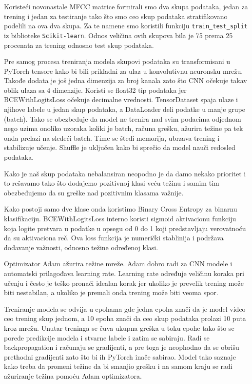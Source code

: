 \documentclass[a4paper,12pt]{article}
\begin{document}
Koristeći novonastale MFCC matrice formirali smo dva skupa podataka, jedan za trening i jedan za testiranje tako što smo ceo skup podataka stratifikovano podelili na ova dva skupa. Za te namene smo koristili funkciju \texttt{train\_test\_split} iz biblioteke \texttt{Scikit-learn}. Odnos veličina ovih skupova bila je 75 prema 25 procenata za trening odnosno test skup podataka. 

Pre samog procesa treniranja modela skupovi podataka su transformisani u PyTorch tensore kako bi bili prikladni za ulaz u konvolutivnu neuronsku mrežu. Takođe dodata je još jedna dimenzija za broj kanala zato što CNN očekuje takav oblik ulaza sa 4 dimenzije. Koristi se float32 tip podataka jer BCEWithLogitsLoss očekuje decimalne vrednosti. TensorDataset spaja ulaze i njihove labele u jedan skup podataka, a DataLoader deli podatke u manje grupe (batch). Tako se obezbeđuje da model ne trenira nad svim podacima odjednom nego uzima onoliko uzoraka koliki je batch, računa grešku, ažurira težine pa tek onda prelazi na sledeći batch. Time se štedi memorija, ubrzava trening i stabilizuje učenje. Shuffle je uključen kako bi sprečio da model nauči redosled podataka.

Kako je naš skup podataka nebalansiran neopodno je da damo nekako prioritet i to rešavamo tako što dodajemo pozitivnoj klasi veću težinu i samim tim obezbeđujemo da su greške nad pozitivnim klasama važnije.

Kako postoji samo dve klase onda koristimo Binary Cross Entropy za binarnu klasifikaciju. BCEWithLogitsLoss interno koristi sigmoid aktivacionu funkciju koja logite pretvara u podatke u opsegu od 0 do 1 koji predstavljaju verovatnoću da su aktivaciona reč. Ova loss funkcija je numerički stablinija i podržava dodavanje važnosti, odnosno težine određenoj klasi.

Optimizator Adam ažurira težine mreže. Adam dobro radi za CNN modele i automatski prilagođava learning rate. Learning rate određuje veličinu koraka pri učenju i često je teško pronaći idealan korak jer ukoliko je prevelik trening može biti nestabilan, a ukoliko je premali onda trening može biti veoma spor.

Treniranje modela se odvija u epohama gde jedna epoha znači da je model video ceo trening skup jednom, a 10 epoha znači da ceo skup podataka prolazi 10 puta kroz mrežu. Unutar treninga se čuva ukupna greška u toku epohe tako što se porede predikcije modela i stvarne labele i zatim se sabiraju. Radi se backpropagation i računaju se gradijenti, a pre toga je neophodno da se obrišu prethodni gradijenti zato što bi ih PyTorch inače sabirao. Model tako saznaje kako treba da promeni težine da bi smanjio grešku i na samom kraju se radi ažuriranje težina pomoću Adam optimizatora.
\end{document}
